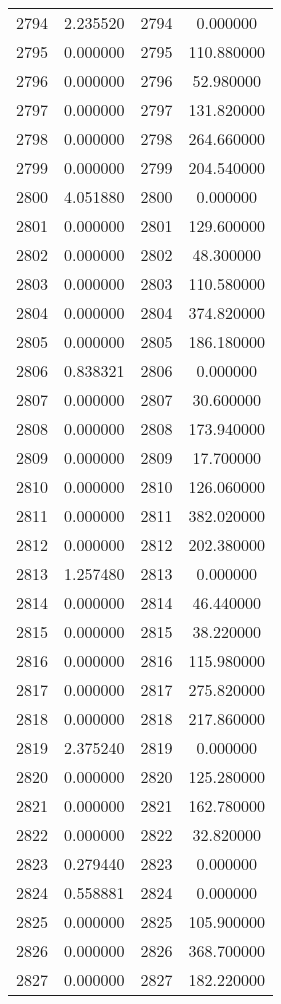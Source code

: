 \documentclass[12pt]{article}
\begin{document}
\begin{longtable}{@{}cccc@{}}
2794 & 2.235520 & 2794 & 0.000000 \\
2795 & 0.000000 & 2795 & 110.880000 \\
2796 & 0.000000 & 2796 & 52.980000 \\
2797 & 0.000000 & 2797 & 131.820000 \\
2798 & 0.000000 & 2798 & 264.660000 \\
2799 & 0.000000 & 2799 & 204.540000 \\
2800 & 4.051880 & 2800 & 0.000000 \\
2801 & 0.000000 & 2801 & 129.600000 \\
2802 & 0.000000 & 2802 & 48.300000 \\
2803 & 0.000000 & 2803 & 110.580000 \\
2804 & 0.000000 & 2804 & 374.820000 \\
2805 & 0.000000 & 2805 & 186.180000 \\
2806 & 0.838321 & 2806 & 0.000000 \\
2807 & 0.000000 & 2807 & 30.600000 \\
2808 & 0.000000 & 2808 & 173.940000 \\
2809 & 0.000000 & 2809 & 17.700000 \\
2810 & 0.000000 & 2810 & 126.060000 \\
2811 & 0.000000 & 2811 & 382.020000 \\
2812 & 0.000000 & 2812 & 202.380000 \\
2813 & 1.257480 & 2813 & 0.000000 \\
2814 & 0.000000 & 2814 & 46.440000 \\
2815 & 0.000000 & 2815 & 38.220000 \\
2816 & 0.000000 & 2816 & 115.980000 \\
2817 & 0.000000 & 2817 & 275.820000 \\
2818 & 0.000000 & 2818 & 217.860000 \\
2819 & 2.375240 & 2819 & 0.000000 \\
2820 & 0.000000 & 2820 & 125.280000 \\
2821 & 0.000000 & 2821 & 162.780000 \\
2822 & 0.000000 & 2822 & 32.820000 \\
2823 & 0.279440 & 2823 & 0.000000 \\
2824 & 0.558881 & 2824 & 0.000000 \\
2825 & 0.000000 & 2825 & 105.900000 \\
2826 & 0.000000 & 2826 & 368.700000 \\
2827 & 0.000000 & 2827 & 182.220000 \\

\end{longtable}
\end{document}
